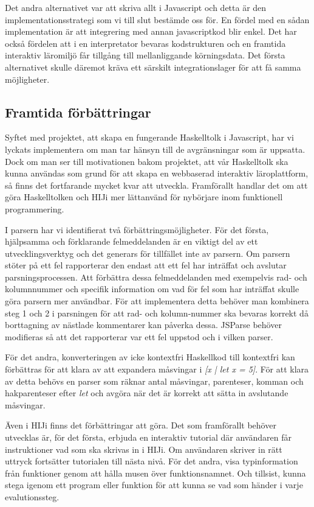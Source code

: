 Det andra alternativet var att skriva allt i Javascript och detta är den
implementationsstrategi som vi till slut bestämde oss för.
En fördel med en sådan implementation är att integrering med annan
javascriptkod blir enkel.
Det har också fördelen att i en interpretator bevaras kodstrukturen och en framtida interaktiv läromiljö får tillgång till mellanliggande körningsdata.
Det första alternativet skulle däremot kräva ett
särskilt integrationslager för att få samma möjligheter.



\subsection{Framtida förbättringar}

Syftet med projektet, att skapa en fungerande Haskelltolk i Javascript, har vi lyckats implementera om man tar hänsyn till de avgränsningar som är uppsatta. Dock om man ser till motivationen bakom projektet, att vår Haskelltolk ska kunna användas som grund för att skapa en webbaserad interaktiv läroplattform, så finns det fortfarande mycket kvar att utveckla. Framförallt handlar det om att göra Haskelltolken och HIJi mer lättanvänd för nybörjare inom funktionell programmering.

I parsern har vi identifierat två förbättringsmöjligheter. För det första, hjälpsamma och förklarande felmeddelanden är en viktigt del av ett utvecklingsverktyg och det generars för tillfället inte av parsern. 
Om parsern stöter på ett fel rapporterar den endast att ett fel har inträffat och avslutar parsningsprocessen. 
Att förbättra dessa felmeddelanden med exempelvis rad- och kolumnnummer och specifik information om vad för fel som har inträffat skulle göra parsern mer användbar.
För att implementera detta behöver man kombinera steg 1 och 2 i parsningen för att rad- och kolumn-nummer ska bevaras korrekt då borttagning av nästlade kommentarer kan påverka dessa.
JSParse behöver modifieras så att det rapporterar var ett fel uppstod och i vilken parser.

För det andra, konverteringen av icke kontextfri Haskellkod till kontextfri kan förbättras 
för att klara av att expandera måsvingar i \emph{[x | let x = 5]}. 
För att klara av detta behövs en parser som räknar antal måsvingar, parenteser, 
komman och hakparenteser efter \emph{let} och avgöra när det är korrekt att sätta in avslutande måsvingar.

Även i HIJi finns det förbättringar att göra.
Det som framförallt behöver utvecklas är, för det första, erbjuda en interaktiv tutorial där användaren får instruktioner vad som ska skrivas in i HIJi. Om användaren skriver in rätt uttryck fortsätter tutorialen till nästa nivå.
För det andra, visa typinformation från funktioner genom att hålla musen över funktionsnamnet.
Och tillsist, kunna stega igenom ett program eller funktion för att kunna se vad som händer i varje evalutionssteg. 
